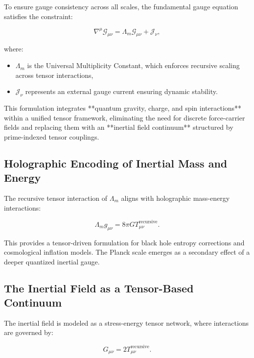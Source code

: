 \documentclass{article}
\theoremstyle{plain}
\begin{document}
To ensure gauge consistency across all scales, the fundamental gauge equation satisfies the constraint:

\begin{equation}
    \nabla^\mu \mathcal{G}_{\mu\nu} = \Lambda_m \mathcal{G}_{\mu\nu} + \mathcal{J}_\nu,
\end{equation}

where:
\begin{itemize}
    \item $\Lambda_m$ is the Universal Multiplicity Constant, which enforces recursive scaling across tensor interactions,
    \item $\mathcal{J}_\nu$ represents an external gauge current ensuring dynamic stability.
\end{itemize}

This formulation integrates **quantum gravity, charge, and spin interactions** within a unified tensor framework, eliminating the need for discrete force-carrier fields and replacing them with an **inertial field continuum** structured by prime-indexed tensor couplings.


\subsection{Holographic Encoding of Inertial Mass and Energy}

The recursive tensor interaction of $\Lambda_m$ aligns with holographic mass-energy interactions:

\begin{equation}
    \Lambda_m g_{\mu\nu} = 8\pi G T_{\mu\nu}^{\text{recursive}}.
\end{equation}

This provides a tensor-driven formulation for black hole entropy corrections and cosmological inflation models. The Planck scale emerges as a secondary effect of a deeper quantized inertial gauge.

\subsection{The Inertial Field as a Tensor-Based Continuum}

The inertial field is modeled as a stress-energy tensor network, where interactions are governed by:

\begin{equation}
    G_{\mu\nu} = 2 T_{\mu\nu}^{\text{recursive}}.
\end{equation}
\end{document}

